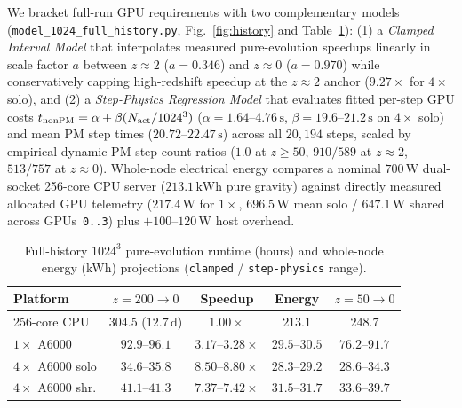 \documentclass[aps,prd,reprint,superscriptaddress,nofootinbib,amsmath,amssymb,floatfix,longbibliography]{revtex4-2}
\begin{document}
We bracket full-run GPU requirements with two complementary models (\texttt{model\_1024\_full\_history.py}, Fig.~\ref{fig:history} and Table~\ref{tab:fullrun}):
(1) a \textit{Clamped Interval Model} that interpolates measured pure-evolution speedups linearly in scale factor $a$ between $z \approx 2$ ($a=0.346$) and $z \approx 0$ ($a=0.970$) while conservatively capping high-redshift speedup at the $z \approx 2$ anchor ($9.27\times$ for $4\times$ solo), and
(2) a \textit{Step-Physics Regression Model} that evaluates fitted per-step GPU costs $t_{\rm nonPM} = \alpha + \beta (N_{\rm act}/1024^3)$ ($\alpha=1.64$--$4.76\,\mathrm{s}$, $\beta=19.6$--$21.2\,\mathrm{s}$ on $4\times$ solo) and mean PM step times ($20.72$--$22.47\,\mathrm{s}$) across all $20{,}194$ steps, scaled by empirical dynamic-PM step-count ratios ($1.0$ at $z \ge 50$, $910/589$ at $z \approx 2$, $513/757$ at $z \approx 0$). Whole-node electrical energy compares a nominal $700\,\mathrm{W}$ dual-socket 256-core CPU server ($213.1\,\mathrm{kWh}$ pure gravity) against directly measured allocated GPU telemetry ($217.4\,\mathrm{W}$ for $1\times$, $696.5\,\mathrm{W}$ mean solo / $647.1\,\mathrm{W}$ shared across GPUs~\texttt{0..3}) plus $+100$--$120\,\mathrm{W}$ host overhead.

\begin{table}[!tbp]
\caption{Full-history $1024^3$ pure-evolution runtime (hours) and whole-node energy (kWh) projections (\texttt{clamped} / \texttt{step-physics} range).}\label{tab:fullrun}
\scriptsize
\setlength{\tabcolsep}{2pt}
\begin{ruledtabular}
\begin{tabular}{lcccc}
Platform & $z=200{\to}0$ & Speedup & Energy & $z=50{\to}0$ \\
\hline
256-core CPU & $304.5$ ($12.7\,\mathrm{d}$) & $1.00\times$ & $213.1$ & $248.7$ \\
$1\times$ A6000 & $92.9$--$96.1$ & $3.17$--$3.28\times$ & $29.5$--$30.5$ & $76.2$--$91.7$ \\
$4\times$ A6000 solo & $\mathbf{34.6\text{--}35.8}$ & $\mathbf{8.50\text{--}8.80\times}$ & $\mathbf{28.3\text{--}29.2}$ & $\mathbf{28.6\text{--}34.3}$ \\
$4\times$ A6000 shr. & $41.1$--$41.3$ & $7.37$--$7.42\times$ & $31.5$--$31.7$ & $33.6$--$39.7$ \\
\end{tabular}
\end{ruledtabular}
\end{table}
\end{document}
